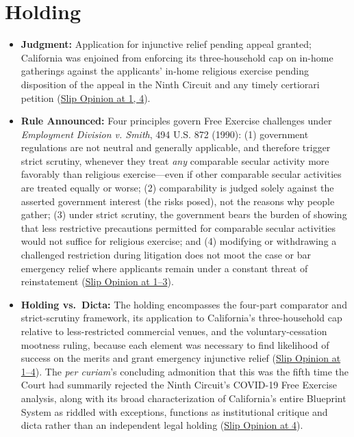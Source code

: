 \documentclass[12pt]{article}
\begin{document}
\section{Holding}
\begin{itemize}
\item \textbf{Judgment:} Application for injunctive relief pending appeal granted; California was enjoined from enforcing its three-household cap on in-home gatherings against the applicants' in-home religious exercise pending disposition of the appeal in the Ninth Circuit and any timely certiorari petition (\href{https://www.supremecourt.gov/opinions/20pdf/20a151_4g15.pdf}{Slip Opinion at 1, 4}).
\item \textbf{Rule Announced:} Four principles govern Free Exercise challenges under \textit{Employment Division v. Smith}, 494 U.S. 872 (1990): (1) government regulations are not neutral and generally applicable, and therefore trigger strict scrutiny, whenever they treat \textit{any} comparable secular activity more favorably than religious exercise---even if other comparable secular activities are treated equally or worse; (2) comparability is judged solely against the asserted government interest (the risks posed), not the reasons why people gather; (3) under strict scrutiny, the government bears the burden of showing that less restrictive precautions permitted for comparable secular activities would not suffice for religious exercise; and (4) modifying or withdrawing a challenged restriction during litigation does not moot the case or bar emergency relief where applicants remain under a constant threat of reinstatement (\href{https://www.supremecourt.gov/opinions/20pdf/20a151_4g15.pdf}{Slip Opinion at 1--3}).
\item \textbf{Holding vs.\ Dicta:} The holding encompasses the four-part comparator and strict-scrutiny framework, its application to California's three-household cap relative to less-restricted commercial venues, and the voluntary-cessation mootness ruling, because each element was necessary to find likelihood of success on the merits and grant emergency injunctive relief (\href{https://www.supremecourt.gov/opinions/20pdf/20a151_4g15.pdf}{Slip Opinion at 1--4}). The \textit{per curiam}'s concluding admonition that this was the fifth time the Court had summarily rejected the Ninth Circuit's COVID-19 Free Exercise analysis, along with its broad characterization of California's entire Blueprint System as riddled with exceptions, functions as institutional critique and dicta rather than an independent legal holding (\href{https://www.supremecourt.gov/opinions/20pdf/20a151_4g15.pdf}{Slip Opinion at 4}).
\end{itemize}
\end{document}
